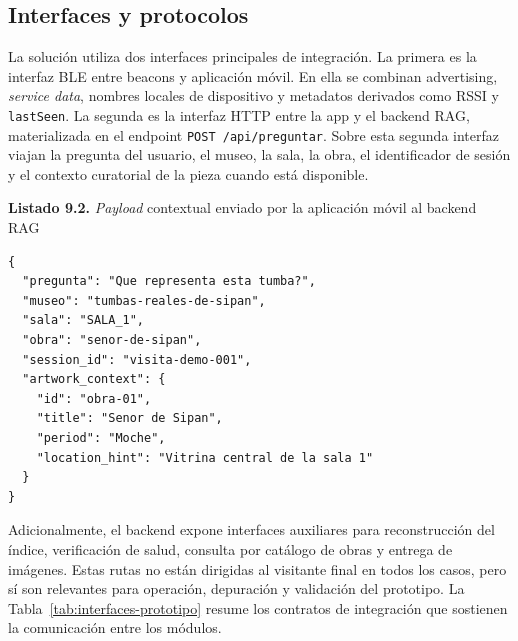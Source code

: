 \subsection{Interfaces y protocolos}

La solución utiliza dos interfaces principales de integración. La primera es la interfaz BLE entre beacons y aplicación móvil. En ella se combinan advertising, \textit{service data}, nombres locales de dispositivo y metadatos derivados como RSSI y \texttt{lastSeen}. La segunda es la interfaz HTTP entre la app y el backend RAG, materializada en el endpoint \texttt{POST /api/preguntar}. Sobre esta segunda interfaz viajan la pregunta del usuario, el museo, la sala, la obra, el identificador de sesión y el contexto curatorial de la pieza cuando está disponible.

\begin{center}
\textbf{Listado 9.2.} \textit{Payload} contextual enviado por la aplicación móvil al backend RAG
\end{center}

\begin{lstlisting}[style=codebase]
{
  "pregunta": "Que representa esta tumba?",
  "museo": "tumbas-reales-de-sipan",
  "sala": "SALA_1",
  "obra": "senor-de-sipan",
  "session_id": "visita-demo-001",
  "artwork_context": {
    "id": "obra-01",
    "title": "Senor de Sipan",
    "period": "Moche",
    "location_hint": "Vitrina central de la sala 1"
  }
}
\end{lstlisting}

Adicionalmente, el backend expone interfaces auxiliares para reconstrucción del índice, verificación de salud, consulta por catálogo de obras y entrega de imágenes. Estas rutas no están dirigidas al visitante final en todos los casos, pero sí son relevantes para operación, depuración y validación del prototipo. La Tabla~\ref{tab:interfaces-prototipo} resume los contratos de integración que sostienen la comunicación entre los módulos.

